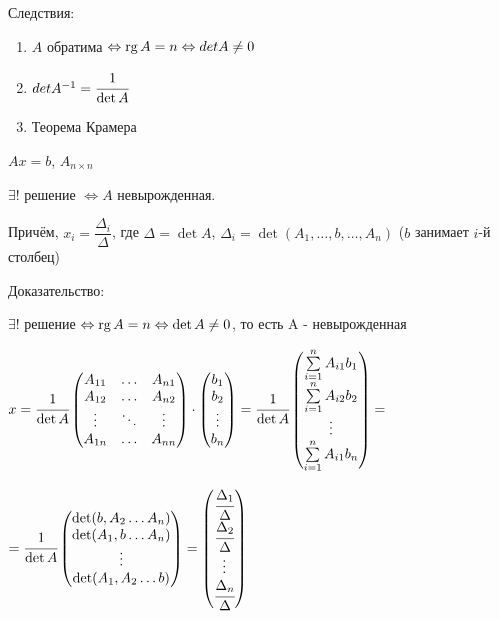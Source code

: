 Следствия:
\begin{enumerate}
    \item \(A\) обратима \(\Leftrightarrow \operatorname{rg} A = n \Leftrightarrow det A \neq 0\)

    \item \(det A^{-1} = \cfrac{1}{\det A }\)

    \item Теорема Крамера
\end{enumerate}


\(Ax = b\), \(A_{n\times n}\)

\(\exists! \) решение \(\Leftrightarrow A\) невырожденная.

Причём, \(x_i = \dfrac{\Delta_i}{\Delta}\), где \(\Delta = \det A\), \(\Delta_i = \det (A_1, \ldots, b, \ldots, A_n)\) (\(b\) занимает \(i\)-й столбец)


Доказательство:

\(\exists! \) решение \(\Leftrightarrow \operatorname{rg} A = n \Leftrightarrow \det A \neq 0\), то есть A - невырожденная

\(x = \cfrac{1}{\det A} \begin{pmatrix}
    A_{11} & \ldots & A_{n1} \\
    A_{12} & \ldots & A_{n2} \\
    \vdots & \ddots & \vdots \\
    A_{1n} & \ldots & A_{nn} \\
\end{pmatrix} \cdot
\begin{pmatrix}
    b_1    \\
    b_2    \\
    \vdots \\
    b_n
\end{pmatrix}
=
\cfrac{1}{\det A}
\begin{pmatrix}
    \sum\limits_{i=1}^n A_{i1}b_1 \\
    \sum\limits_{i=1}^n A_{i2}b_2 \\
    \vdots                        \\
    \sum\limits_{i=1}^n A_{i1}b_n
\end{pmatrix} =\)

\(=\cfrac{1}{\det A}
\begin{pmatrix}
    \det (b,A_2\ldots A_n) \\
    \det (A_1,b\ldots A_n) \\
    \vdots                 \\
    \det (A_1,A_2\ldots b)
\end{pmatrix} =
\begin{pmatrix}
    \cfrac{\Delta_1}{\Delta} \\
    \cfrac{\Delta_2}{\Delta} \\
    \vdots                   \\
    \cfrac{\Delta_n}{\Delta}
\end{pmatrix}\)


